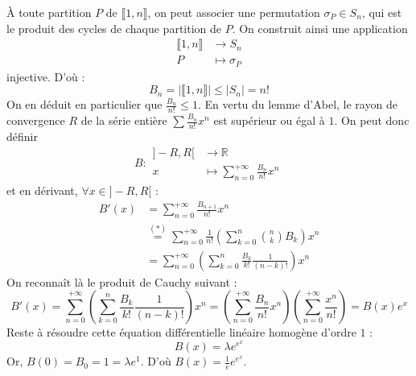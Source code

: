 \begin{demonstration}
		À toute partition $P$ de $\llbracket 1, n \rrbracket$, on peut associer une permutation $\sigma_P \in S_n$, qui est le produit des cycles de chaque partition de $P$. On construit ainsi une application
		\[
		\begin{array}{cl}
			\llbracket 1, n \rrbracket &\rightarrow S_n \\
			P &\mapsto \sigma_P
		\end{array}
		\]
		injective. D'où :
		\[ B_n = |\llbracket 1, n \rrbracket| \leq |S_n| = n! \]
		On en déduit en particulier que $\frac{B_n}{n!} \leq 1$. En vertu du lemme d'Abel, le rayon de convergence $R$ de la série entière $\sum \frac{B_n}{n!} x^n$ est supérieur ou égal à $1$. On peut donc définir
		\[
		B :
		\begin{array}{cl}
			]-R,R[ &\rightarrow \mathbb{R} \\
			x &\mapsto \sum_{n=0}^{+\infty} \frac{B_n}{n!} x^n
		\end{array}
		\]
		et en dérivant, $\forall x \in ]-R,R[$ :
		\begin{align*}
			B'(x) &= \sum_{n=0}^{+\infty} \frac{B_{n+1}}{n!} x^n \\
			&\overset{(*)}{=} \sum_{n=0}^{+\infty} \frac{1}{n!} \left( \sum_{k=0}^n \binom{n}{k} B_k \right) x^n \\
			&= \sum_{n=0}^{+\infty} \left( \sum_{k=0}^n \frac{B_k}{k!} \frac{1}{(n-k)!} \right) x^n
		\end{align*}
		On reconnaît là le produit de Cauchy suivant :
		\[ B'(x) = \sum_{n=0}^{+\infty} \left( \sum_{k=0}^n \frac{B_k}{k!} \frac{1}{(n-k)!} \right) x^n = \left( \sum_{n=0}^{+\infty} \frac{B_n}{n!} x^n \right) \left( \sum_{n=0}^{+\infty} \frac{x^n}{n!} \right) = B(x) e^x \]
		Reste à résoudre cette équation différentielle linéaire homogène d'ordre $1$ :
		\[ B(x) = \lambda e^{e^x} \]
		Or, $B(0) = B_0 = 1 = \lambda e^1$. D'où $B(x) = \frac{1}{e} e^{e^x}$.


\end{demonstration}
